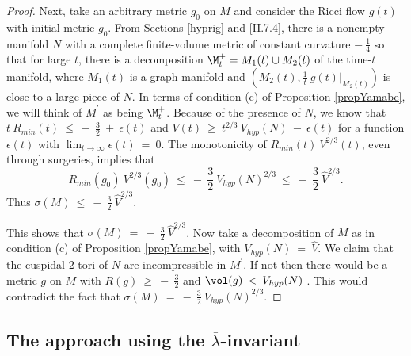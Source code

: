 \begin{proof}
Next, take an arbitrary metric
$g_0$ on $M$ and consider the Ricci flow $g(t)$ with initial metric $g_0$.
From Sections \ref{hyprig} and  \ref{II.7.4}, there is a nonempty
manifold $N$ with a complete finite-volume metric
of constant curvature $- \: \frac14$
so that for large $t$, there is a decomposition $\M^+_t = M_1(t) \cup M_2(t)$ of the time-$t$ manifold,
where $M_1(t)$ is a graph manifold and $(M_2(t), \frac{1}{t} \: g(t) \big|_{M_2(t)})$
is close to a large
piece of $N$. In terms of condition (c) of Proposition \ref{propYamabe}, we will think
of $M^\prime$ as being $\M^+_t$.
Because of the presence of $N$, we know that $t \: R_{min}(t) \: \le \: - \:
\frac32 \: + \: \epsilon(t)$ and
$V(t) \: \ge \:
t^{2/3} \: V_{hyp}(N) \: - \: \epsilon(t)$ for a function $\epsilon(t)$
with $\lim_{t \rightarrow \infty}
\epsilon(t) \: = \: 0$. The monotonicity of
$R_{min}(t) \: V^{2/3}(t)$, even through surgeries, implies that
\begin{equation}
R_{min}(g_0) \: V^{2/3}(g_0) \: \le \: - \: \frac32 \: V_{hyp}(N)^{2/3}
 \: \le \: - \: \frac32 \: \widehat{V}^{2/3}.
 \end{equation}
Thus $\sigma(M) \: \le \: - \: \frac32 \: \widehat{V}^{2/3}$.

This shows that
$\sigma(M) \: = \: - \: \frac32 \: \widehat{V}^{2/3}$.
Now take a decomposition of $M$ as in
condition (c) of Proposition \ref{propYamabe}, with
$V_{hyp}(N) \: = \: \widehat{V}$. We claim that the cuspidal $2$-tori of $N$
are incompressible in $M^\prime$. If not
then there would be a metric  $g$ on $M$ with $R(g) \: \ge \: - \: \frac32$ and
$\vol(g) \: < \: V_{hyp}(N)$ \cite[Pf. of Theorem 2.9]{Anderson}.
This would contradict the fact that
$\sigma(M) \: = \: - \: \frac32 \: V_{hyp}(N)^{2/3}$.
\end{proof}

\subsection{The approach using the $\overline{\lambda}$-invariant}


